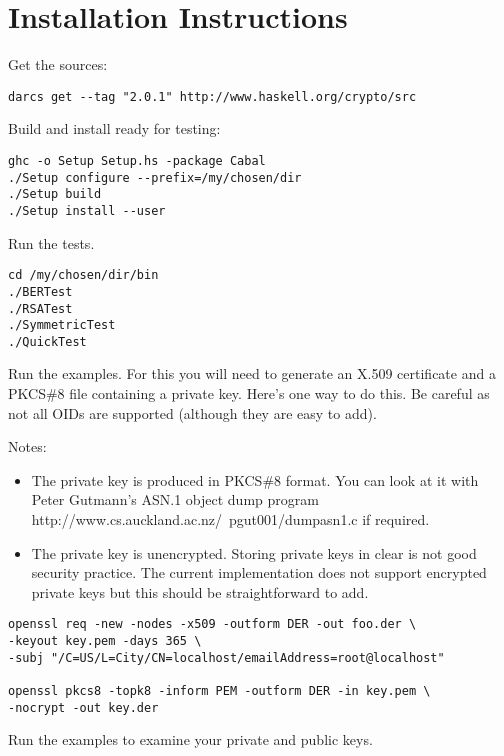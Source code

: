 \documentclass{article}
\begin{document}
\section{Installation Instructions}

Get the sources:

\lstset{language=shell,basicstyle=\ttfamily\small}
\begin{lstlisting}[frame=single]
darcs get --tag "2.0.1" http://www.haskell.org/crypto/src
\end{lstlisting}

Build and install ready for testing:

\begin{lstlisting}[frame=single]
ghc -o Setup Setup.hs -package Cabal
./Setup configure --prefix=/my/chosen/dir
./Setup build
./Setup install --user
\end{lstlisting}

Run the tests.

\begin{lstlisting}[frame=single]
cd /my/chosen/dir/bin
./BERTest
./RSATest
./SymmetricTest
./QuickTest
\end{lstlisting}

Run the examples. For this you will need to generate an X.509 certificate
and a PKCS\#8 file containing a private key. Here's one way to do this.
Be careful as not all OIDs are supported (although they are easy to add).

Notes:
\begin{itemize}
\item
The private key is produced in PKCS\#8 format.
You can look at it with Peter Gutmann's ASN.1 
\htmladdnormallinkfoot
{object dump program}
{http://www.cs.auckland.ac.nz/~pgut001/dumpasn1.c}
if required. 
\item
The private key is unencrypted. Storing private keys in clear 
is not good security practice. The current implementation does not support 
encrypted private keys but this should be straightforward to add.
\end{itemize}

\begin{lstlisting}[frame=single]
openssl req -new -nodes -x509 -outform DER -out foo.der \
-keyout key.pem -days 365 \
-subj "/C=US/L=City/CN=localhost/emailAddress=root@localhost"

openssl pkcs8 -topk8 -inform PEM -outform DER -in key.pem \
-nocrypt -out key.der
\end{lstlisting}

Run the examples to examine your private and public keys.
\end{document}
